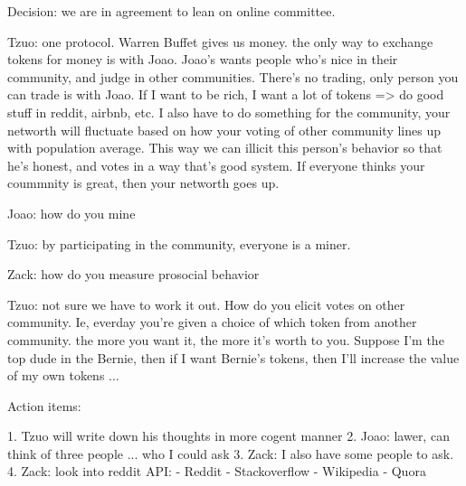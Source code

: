 Decision: we are in agreement to lean on online committee.

Tzuo: one protocol. Warren Buffet gives us money. the only way to exchange tokens for money is with Joao. Joao's wants people who's nice in their community, and judge in other communities. There's no trading, only person you can trade is with Joao. If I want to be rich, I want a lot of tokens => do good stuff in reddit, airbnb, etc. I also have to do something for the community, your networth will fluctuate based on how your voting of other community lines up with population average. This way we can illicit this person's behavior so that he's honest, and votes in a way that's good system. If everyone thinks your coummnity is great, then your networth goes up.  

Joao: how do you mine

Tzuo: by participating in the community, everyone is a miner. 

Zack: how do you measure prosocial behavior

Tzuo: not sure we have to work it out. How do you elicit votes on other community. Ie, everday you're given a choice of which token from another community. the more you want it, the more it's worth to you. Suppose I'm the top dude in the Bernie, then if I want Bernie's tokens, then I'll increase the value of my own tokens ... 

Action items: 

1. Tzuo will write down his thoughts in more cogent manner
2. Joao: lawer, can think of three people ... who I could ask
3. Zack: I also have some people to ask. 
4. Zack: look into reddit API:
	- Reddit
	- Stackoverflow
	- Wikipedia
	- Quora

